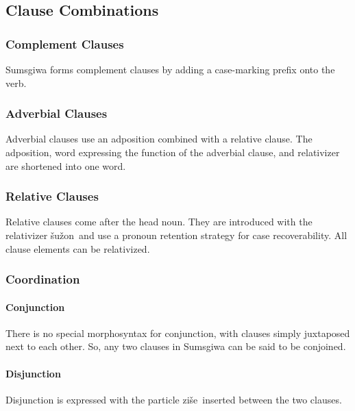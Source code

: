 \subsection{Clause Combinations}

\subsubsection{Complement Clauses}
Sumsgiwa forms complement clauses by adding a case-marking prefix onto the verb.

\subsubsection{Adverbial Clauses}
Adverbial clauses use an adposition combined with a relative clause. The adposition, word expressing the function of the adverbial clause, and relativizer are shortened into one word.


\subsubsection{Relative Clauses} \label{04_06_03_Relative Clauses}
Relative clauses come after the head noun. They are introduced with the relativizer \textlangle \v{s}u\v{z}on\textrangle~and use a pronoun retention strategy for case recoverability. All clause elements can be relativized.

\subsubsection{Coordination}

\paragraph{Conjunction}
There is no special morphosyntax for conjunction, with clauses simply juxtaposed next to each other. So, any two clauses in Sumsgiwa can be said to be conjoined.

\paragraph{Disjunction}
Disjunction is expressed with the particle \textlangle zi\v{s}e\textrangle~inserted between the two clauses.
